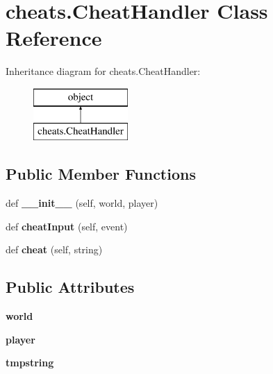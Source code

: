 \hypertarget{classcheats_1_1_cheat_handler}{}\section{cheats.\+Cheat\+Handler Class Reference}
\label{classcheats_1_1_cheat_handler}
Inheritance diagram for cheats.\+Cheat\+Handler\+:\begin{figure}[H]
\begin{center}
\leavevmode
\includegraphics[height=2.000000cm]{classcheats_1_1_cheat_handler}
\end{center}
\end{figure}
\subsection*{Public Member Functions}
\begin{DoxyCompactItemize}
\item 
\hypertarget{classcheats_1_1_cheat_handler_aded4b767ec4bfad7506bfeaaab074ab3}{}def {\bfseries \+\_\+\+\_\+init\+\_\+\+\_\+} (self, world, player)\label{classcheats_1_1_cheat_handler_aded4b767ec4bfad7506bfeaaab074ab3}

\item 
\hypertarget{classcheats_1_1_cheat_handler_ab054d1be1c71b1707670913a966be223}{}def {\bfseries cheat\+Input} (self, event)\label{classcheats_1_1_cheat_handler_ab054d1be1c71b1707670913a966be223}

\item 
\hypertarget{classcheats_1_1_cheat_handler_af65e21451315bf3ac8780297bcc3f12c}{}def {\bfseries cheat} (self, string)\label{classcheats_1_1_cheat_handler_af65e21451315bf3ac8780297bcc3f12c}

\end{DoxyCompactItemize}
\subsection*{Public Attributes}
\begin{DoxyCompactItemize}
\item 
\hypertarget{classcheats_1_1_cheat_handler_a9afd5f3dbdecdda1d0334916bb3abdd8}{}{\bfseries world}\label{classcheats_1_1_cheat_handler_a9afd5f3dbdecdda1d0334916bb3abdd8}

\item 
\hypertarget{classcheats_1_1_cheat_handler_a390a6ad4dd4fc97d214b60c710b5952c}{}{\bfseries player}\label{classcheats_1_1_cheat_handler_a390a6ad4dd4fc97d214b60c710b5952c}

\item 
\hypertarget{classcheats_1_1_cheat_handler_a78842c953cb208ad3e7c3b3a26a1224b}{}{\bfseries tmpstring}\label{classcheats_1_1_cheat_handler_a78842c953cb208ad3e7c3b3a26a1224b}

\end{DoxyCompactItemize}


